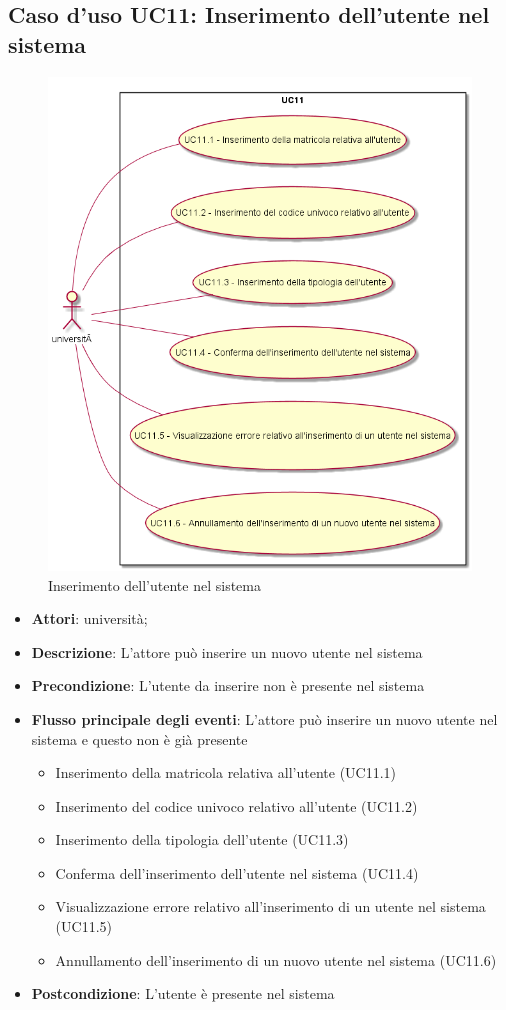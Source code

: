 \subsection{Caso d'uso \texorpdfstring{UC11}{UC11}: Inserimento dell'utente nel sistema}
\begin{figure} [H]
\centering
\includegraphics[scale=0.45]{./img/UC11.png}
\caption{Inserimento dell'utente nel sistema}\label{}
\end{figure}
\begin{itemize}
\item \textbf{Attori}: università;
\item \textbf{Descrizione}: L'attore può inserire un nuovo utente nel sistema
\item \textbf{Precondizione}: L'utente da inserire non è presente nel sistema
\item \textbf{Flusso principale degli eventi}: L'attore può inserire un nuovo utente nel sistema e questo non è già presente
\begin{itemize}
\item Inserimento della matricola relativa all'utente (UC11.1)
\item Inserimento del codice univoco relativo all'utente (UC11.2)
\item Inserimento della tipologia dell'utente (UC11.3)
\item Conferma dell'inserimento dell'utente nel sistema (UC11.4)
\item Visualizzazione errore relativo all'inserimento di un utente nel sistema (UC11.5)
\item Annullamento dell'inserimento di un nuovo utente nel sistema (UC11.6)
\end{itemize}
\item \textbf{Postcondizione}: L'utente è presente nel sistema
\end{itemize}
